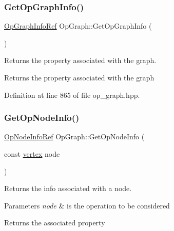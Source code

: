 \subsubsection{\texorpdfstring{Get\+Op\+Graph\+Info()}{GetOpGraphInfo()}}
{\footnotesize\ttfamily \hyperlink{op__graph_8hpp_aa53452ee6eef48921379dd17cb659724}{Op\+Graph\+Info\+Ref} Op\+Graph\+::\+Get\+Op\+Graph\+Info (\begin{DoxyParamCaption}{ }\end{DoxyParamCaption})\hspace{0.3cm}{\ttfamily [inline]}}



Returns the property associated with the graph. 

\begin{DoxyReturn}{Returns}
the property associated with the graph 
\end{DoxyReturn}


Definition at line 865 of file op\+\_\+graph.\+hpp.

\mbox{\label{structOpGraph_a182a5edee5fd5c4c38cf21d3651f7ec1}} 
\subsubsection{\texorpdfstring{Get\+Op\+Node\+Info()}{GetOpNodeInfo()}}
{\footnotesize\ttfamily \hyperlink{op__graph_8hpp_a03ecef2a2ccfe0a14c591757fb6624c4}{Op\+Node\+Info\+Ref} Op\+Graph\+::\+Get\+Op\+Node\+Info (\begin{DoxyParamCaption}\item[{const \hyperlink{graph_8hpp_abefdcf0544e601805af44eca032cca14}{vertex}}]{node }\end{DoxyParamCaption})\hspace{0.3cm}{\ttfamily [inline]}}



Returns the info associated with a node. 


\begin{DoxyParams}{Parameters}
{\em node} & is the operation to be considered \\
\hline
\end{DoxyParams}
\begin{DoxyReturn}{Returns}
the associated property 
\end{DoxyReturn}


